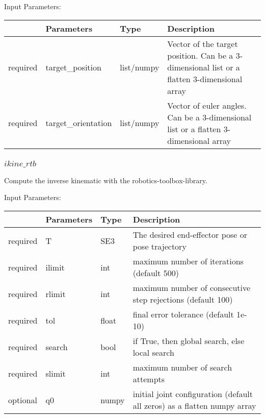 \documentclass[
	ngerman,
	accentcolor=9c,%
	type=intern,
	marginpar=false
	]{tudapub}
\begin{document}
\vspace{0.5cm}
\noindent Input Parameters:
\vspace{0.5cm}

\begin{tabular}{|p{}|p{}|p{}| p{}|}
\hline
 & \textbf{Parameters} & \textbf{Type} & \textbf{Description} \\
\hline
required & target\_position & list/numpy & Vector of the target position. Can be a 3-dimensional list or a flatten 3-dimensional array\\
\hline
required & target\_orientation & list/numpy & Vector of euler angles. Can be a 3-dimensional list or a flatten 3-dimensional array \\
\hline
\end{tabular}
\vspace{1cm}

\subsubsection{$ikine\_rtb$}
\noindent Compute the inverse kinematic with the robotics-toolbox-library. 

\vspace{0.5cm}
\noindent Input Parameters:
\vspace{0.5cm}

\begin{tabular}{|p{}|p{}|p{}| p{}|}
\hline
 & \textbf{Parameters} & \textbf{Type} & \textbf{Description} \\
\hline
required & T & SE3 & The desired end-effector pose or pose trajectory\\
\hline
required & ilimit & int & maximum number of iterations (default 500) \\
\hline
required & rlimit & int & maximum number of consecutive step rejections (default 100)\\
\hline
required & tol & float & final error tolerance (default 1e-10) \\
\hline
required & search & bool & if True, then global search, else local search \\
\hline
required & slimit & int & maximum number of search attempts \\
\hline
optional & q0 & numpy & initial joint configuration (default all zeros) as a flatten numpy array \\
\hline
\end{tabular}
\vspace{1cm}
\end{document}
